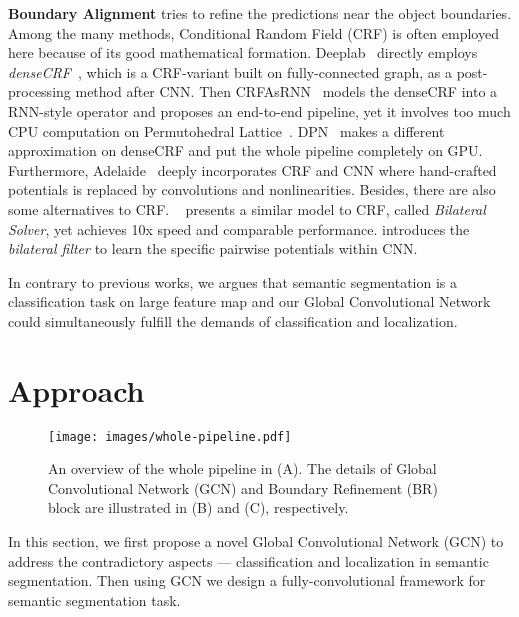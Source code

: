 \documentclass[10pt,twocolumn,letterpaper]{article}
\begin{document}
   \textbf{Boundary Alignment} tries to refine the predictions near the object boundaries. Among the many methods, Conditional Random Field (CRF) is often employed here because of its good mathematical formation. Deeplab~\cite{chen14semantic} directly employs \emph{denseCRF}~\cite{koltun2011efficient}, which is a CRF-variant built on fully-connected graph, as a post-processing method after CNN. Then CRFAsRNN~\cite{zheng2015conditional} models the denseCRF into a RNN-style operator and proposes an end-to-end pipeline, yet it involves too much CPU computation on Permutohedral Lattice~\cite{adams2010fast}. DPN~\cite{liu2015semantic} makes a different approximation on denseCRF and put the whole pipeline completely on GPU. Furthermore, Adelaide~\cite{Lin_2016_CVPR} deeply incorporates CRF and CNN where hand-crafted potentials is replaced by convolutions and nonlinearities. Besides, there are also some alternatives to CRF. ~\cite{BarronPoole2016} presents a similar model to CRF, called \emph{Bilateral Solver}, yet achieves 10x speed and comparable performance. \cite{jampani:cvpr:2016} introduces the \emph{bilateral filter} to learn the specific pairwise potentials within CNN.
\par
   In contrary to previous works, we argues that semantic segmentation is a classification task on large feature map and our Global Convolutional Network could simultaneously fulfill the demands of classification and localization. 
\section{Approach}
\label{sec:approach}
   \begin{figure*}[ht]
      \begin{center}
         \texttt{[image: images/whole-pipeline.pdf]}
      \end{center}
      \caption{ An overview of the whole pipeline in (A). The details of Global Convolutional Network (GCN) and Boundary Refinement (BR) block are illustrated in (B) and (C), respectively. }
      \label{fig:whole-pipeline}
   \end{figure*}
   In this section, we first propose a novel Global Convolutional Network (GCN) to address the contradictory aspects --- classification and localization in semantic segmentation. Then using GCN we design a fully-convolutional framework for semantic segmentation task.
\end{document}
